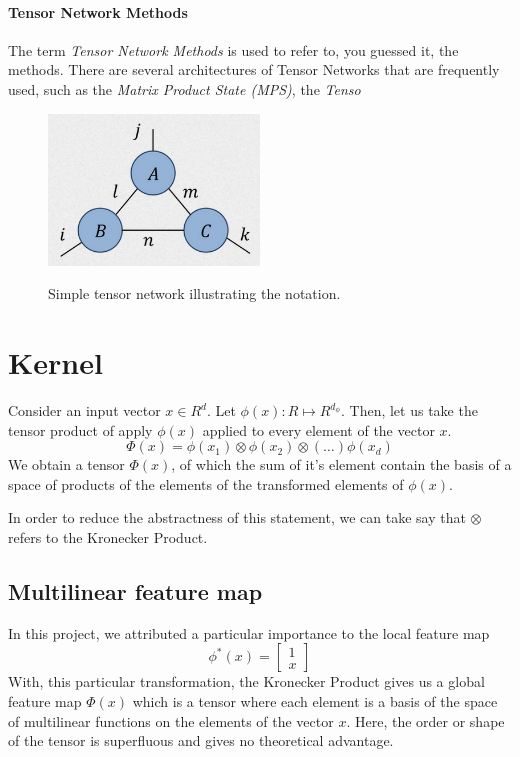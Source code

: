\documentclass[11pt]{article}
\theoremstyle{definition}
\theoremstyle{definition}
\begin{document}
\paragraph{Tensor Network Methods}
The term {\it Tensor Network Methods} is used to refer to, you guessed it, the methods.
There are several architectures of Tensor Networks that are frequently used, such 
as the {\it Matrix Product State (MPS)}, the {\it Tenso}

\begin{figure}[h]
\centering
\caption{Simple tensor network illustrating the notation.}
\includegraphics[width=0.5\textwidth]{images/2023-03-21-10-22-39.png}
\label{fig:tensor_net}
\end{figure}

\section{Kernel}

Consider an input vector $x \in R^d$. Let $\phi(x) : R \mapsto R^{d_{\phi}}$.  
Then, let us take the tensor product of apply $\phi(x)$ applied 
to every element of the vector $x$.
\begin{equation}
    \Phi(x) = \phi(x_1) \otimes  \phi(x_2) 
                \otimes (\dots) \phi(x_d)
\end{equation}
We obtain a tensor $\Phi(x)$, of which the sum of it's element 
contain the basis of a space of products of the elements of the transformed
elements of $\phi(x)$.

In order to reduce the abstractness of this statement, we can take say
that $\otimes$ refers to the Kronecker Product.

\subsection{Multilinear feature map}
In this project, we attributed a particular importance to the local feature map
\begin{equation}
    \phi^*(x) = 
    \begin{bmatrix}
        1 \\
        x
    \end{bmatrix}
\end{equation}
With, this particular transformation, the Kronecker Product gives us a global feature map
$\Phi(x)$ which is a tensor where each element is a basis of the 
space of multilinear functions on the elements of the vector $x$. Here, the 
order or shape of the tensor is superfluous and gives no theoretical advantage.
\end{document}
